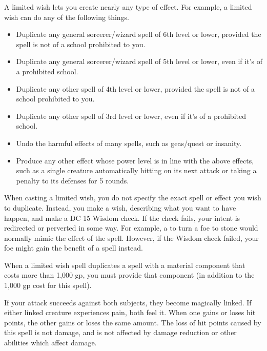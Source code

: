 \spelleffect A limited wish lets you create nearly any type of effect. For example, a limited wish can do any of the following things.
\begin{itemize}
    \item Duplicate any general sorcerer/wizard spell of 6th level or lower, provided the spell is not of a school prohibited to you.
    \item Duplicate any general sorcerer/wizard spell of 5th level or lower, even if it's of a prohibited school.
    \item Duplicate any other spell of 4th level or lower, provided the spell is not of a school prohibited to you.
    \item Duplicate any other spell of 3rd level or lower, even if it's of a prohibited school.
    \item Undo the harmful effects of many spells, such as geas/quest or insanity.
    \item Produce any other effect whose power level is in line with the above effects, such as a single creature automatically hitting on its next attack or taking a  penalty to its defenses for 5 rounds.
\end{itemize}
\par When casting a limited wish, you do not specify the exact spell or effect you wish to duplicate. Instead, you make a wish, describing what you want to have happen, and make a DC 15 Wisdom check. If the check fails, your intent is redirected or perverted in some way. For example, a  to turn a foe to stone would normally mimic the  effect of the  spell. However, if the Wisdom check failed, your foe might gain the benefit of a  spell instead.
\par When a limited wish spell duplicates a spell with a material component that costs more than 1,000 gp, you must provide that component (in addition to the 1,000 gp cost for this spell).

\spelldur{\durshort}
\spelleffect If your attack succeeds against both subjects, they become magically linked. If either linked creature experiences pain, both feel it. When one gains or loses hit points, the other gains or loses the same amount.
\spellnotes The loss of hit points caused by this spell is not damage, and is not affected by damage reduction or other abilities which affect damage.


